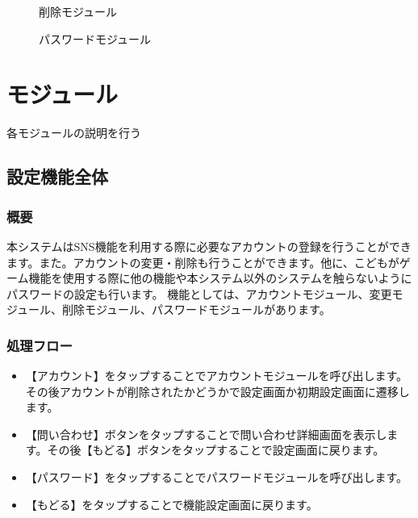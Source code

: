 \documentclass[a4j]{jarticle}
\begin{document}
\begin{figure}[H]
\begin{center}
\caption{削除モジュール}
\label{cameramoju}
\end{center}
\end{figure}

\begin{figure}[H]
\begin{center}
\caption{パスワードモジュール}
\label{comentmoju}
\end{center}
\end{figure}

\section{モジュール}
各モジュールの説明を行う

\subsection{設定機能全体}
\subsubsection*{概要}本システムはSNS機能を利用する際に必要なアカウントの登録を行うことができます。また。アカウントの変更・削除も行うことができます。他に、こどもがゲーム機能を使用する際に他の機能や本システム以外のシステムを触らないようにパスワードの設定も行います。
機能としては、アカウントモジュール、変更モジュール、削除モジュール、パスワードモジュールがあります。

\subsubsection*{処理フロー}
\begin{itemize}
\item 【アカウント】をタップすることでアカウントモジュールを呼び出します。その後アカウントが削除されたかどうかで設定画面か初期設定画面に遷移します。

\item 【問い合わせ】ボタンをタップすることで問い合わせ詳細画面を表示します。その後【もどる】ボタンをタップすることで設定画面に戻ります。

\item 【パスワード】をタップすることでパスワードモジュールを呼び出します。

\item 【もどる】をタップすることで機能設定画面に戻ります。
\end{itemize}
\end{document}
